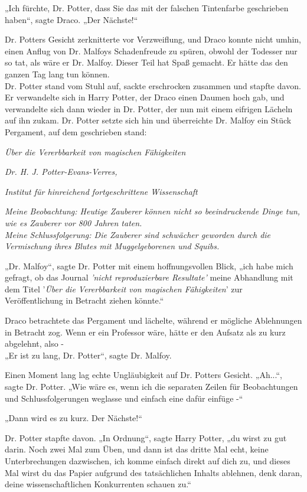 {„Ich fürchte, Dr. Potter, dass Sie das mit der falschen Tintenfarbe geschrieben haben“, sagte Draco. „Der Nächste!“

Dr. Potters Gesicht zerknitterte vor Verzweiflung, und Draco konnte nicht umhin, einen Anflug von Dr. Malfoys Schadenfreude zu spüren, obwohl der Todesser nur so tat, als wäre er Dr. Malfoy. Dieser Teil hat Spaß gemacht. Er hätte das den ganzen Tag lang tun können.\\ Dr. Potter stand vom Stuhl auf, sackte erschrocken zusammen und stapfte davon. Er verwandelte sich in Harry Potter, der Draco einen Daumen hoch gab, und verwandelte sich dann wieder in Dr. Potter, der nun mit einem eifrigen Lächeln auf ihn zukam. Dr. Potter setzte sich hin und überreichte Dr. Malfoy ein Stück Pergament, auf dem geschrieben stand:

\emph{Über die Vererbbarkeit von magischen Fähigkeiten}

\hfill\break

\emph{Dr. H. J. Potter-Evans-Verres,}

\hfill\break

\emph{Institut für hinreichend fortgeschrittene Wissenschaft}

\emph{Meine Beobachtung: Heutige Zauberer können nicht so beeindruckende Dinge tun, wie es Zauberer vor 800 Jahren taten.}\\ \emph{Meine Schlussfolgerung: Die Zauberer sind schwächer geworden durch die Vermischung ihres Blutes mit Muggelgeborenen und Squibs.}

„Dr. Malfoy“, sagte Dr. Potter mit einem hoffnungsvollen Blick, „ich habe mich gefragt, ob das Journal \emph{'nicht reproduzierbare Resultate'} meine Abhandlung mit dem Titel '\emph{Über die Vererbbarkeit von magischen Fähigkeiten}' zur Veröffentlichung in Betracht ziehen könnte.“

Draco betrachtete das Pergament und lächelte, während er mögliche Ablehnungen in Betracht zog. Wenn er ein Professor wäre, hätte er den Aufsatz als zu kurz abgelehnt, also -\\ „Er ist zu lang, Dr. Potter“, sagte Dr. Malfoy.

Einen Moment lang lag echte Ungläubigkeit auf Dr. Potters Gesicht. „Ah...“, sagte Dr. Potter. „Wie wäre es, wenn ich die separaten Zeilen für Beobachtungen und Schlussfolgerungen weglasse und einfach eine dafür einfüge -“

„Dann wird es zu kurz. Der Nächste!“

Dr. Potter stapfte davon. „In Ordnung“, sagte Harry Potter, „du wirst zu gut darin. Noch zwei Mal zum Üben, und dann ist das dritte Mal echt, keine Unterbrechungen dazwischen, ich komme einfach direkt auf dich zu, und dieses Mal wirst du das Papier aufgrund des tatsächlichen Inhalts ablehnen, denk daran, deine wissenschaftlichen Konkurrenten schauen zu.“

}
